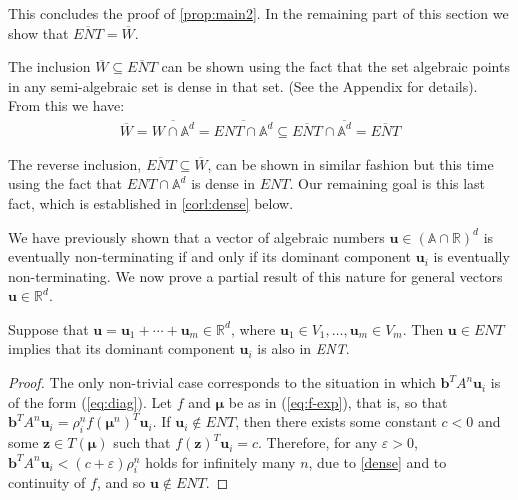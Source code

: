 This concludes the proof of \cref{prop:main2}.
In the remaining part of this section we show that
$\overline{\mathit{ENT}}=\overline{W}$.

The inclusion $\overline{W}\subseteq \overline{ENT}$ can be shown
using the fact that the set algebraic points in any semi-algebraic set
is dense in that set. (See the Appendix for details).  From
this we have:
\begin{align*}
\overline{W}=\overline{W\cap\mathbb{A}^d}=\overline{\mathit{ENT}\cap\mathbb{A}^d} \subseteq \overline{\mathit{ENT}}\cap\overline{\mathbb{A}^d}=\overline{\mathit{ENT}}
\end{align*}

The reverse inclusion, $\overline{ENT}\subseteq\overline{W}$, can be
shown in similar fashion but this time using the fact that
$\mathit{ENT}\cap\mathbb{A}^d$ is dense in $\mathit{ENT}$.  Our
remaining goal is this last fact, which is established in
\cref{corl:dense} below.

We have previously shown that a vector of algebraic numbers
$\boldsymbol{u}\in (\mathbb{A}\cap\mathbb{R})^d$ is eventually
non-terminating if and only if its dominant component
$\boldsymbol{u}_i$ is eventually non-terminating.  We now prove a
partial result of this nature for general vectors $\boldsymbol{u}\in
\mathbb{R}^d$.

\begin{proposition}
  Suppose that $\boldsymbol u=\boldsymbol u_1+\cdots+\boldsymbol
  u_m\in \mathbb{R}^d$, where $\boldsymbol u_1\in
  V_1,\ldots,\boldsymbol u_m\in V_m$. Then $\boldsymbol
  u\in\mathit{ENT}$ implies that its dominant component $\boldsymbol
  u_i$ is also in \textit{ENT}.
\label{prop:dom2}
\end{proposition}
\begin{proof}
  The only non-trivial case corresponds to the situation in which
  $\boldsymbol b^T A^n \boldsymbol u_i$ is of the form (\ref{eq:diag}).
  Let $f$ and $\boldsymbol \mu$ be as in (\ref{eq:f-exp}), that is, so
  that $\boldsymbol b^T A^n \boldsymbol u_i=\rho_i^n f (\boldsymbol
  \mu^n)^T \boldsymbol u_i$. If $\boldsymbol u_i\not\in\mathit{ENT}$,
  then there exists some constant $c<0$ and some $\boldsymbol z\in T(\boldsymbol \mu)$ such that $f(\boldsymbol z)^T \boldsymbol u_i=c$. Therefore, for any $\varepsilon>0$, $\boldsymbol b^T A^n \boldsymbol u_i<(c+\varepsilon)\rho_i^n$ holds for infinitely many $n$, due to \cref{dense} and to continuity of $f$, and so $\boldsymbol u\not\in\mathit{ENT}$.
\end{proof}

